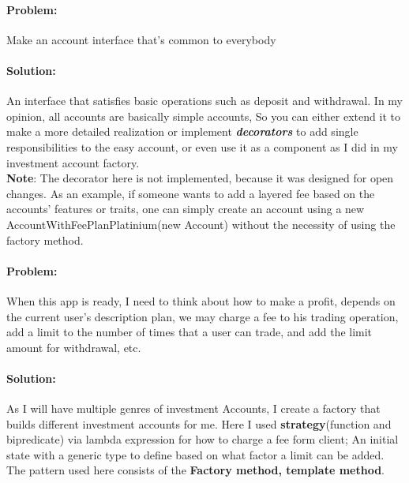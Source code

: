 \documentclass[a4paper,12pt]{report}
\begin{document}
	\paragraph{Problem:} Make an account interface that's common to everybody

	\paragraph{Solution:} An interface that satisfies basic operations such as deposit and withdrawal. In my opinion, all accounts are basically simple accounts, So you can either extend it to make a more detailed realization or implement \textbf{\textit{decorators}} to add single responsibilities to the easy account, or even use it as a component as I did in my investment account factory.
	\\ \textbf{Note}: The decorator here is not implemented, because it was designed for open changes. As an example, if someone wants to add a layered fee based on the accounts' features or traits, one can simply create an account using a new AccountWithFeePlanPlatinium(new Account) without the necessity of using the factory method.

	\paragraph*{Problem:} When this app is ready, I need to think about how to make a profit, depends on the current user's description plan, we may charge a fee to his trading operation, add a limit to the number of times that a user can trade, and add the limit amount for withdrawal, etc. 

	\paragraph*{Solution:} As I will have multiple genres of investment Accounts, I create a factory that builds different investment accounts for me. Here I used \textbf{strategy}(function and bipredicate) via lambda expression for how to charge a fee form client;
	An initial state with a generic type to define based on what factor a limit can be added. The pattern used here consists of the \textbf{Factory method, template method}. 
\end{document}
